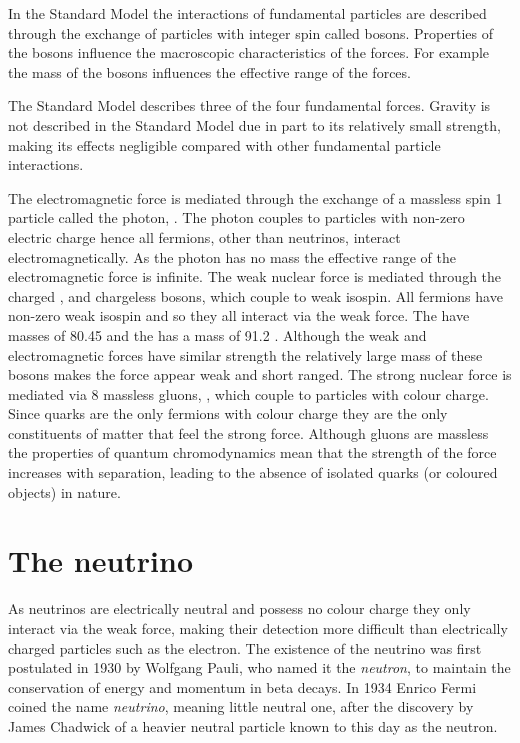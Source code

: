 In the Standard Model the interactions of fundamental particles are described through the exchange of particles with integer spin called bosons. Properties of the bosons influence the macroscopic characteristics of the forces. For example the mass of the bosons influences the effective range of the forces.

The Standard Model describes three of the four fundamental forces. Gravity is not described in the Standard Model due in part to its relatively small strength, making its effects negligible compared with other fundamental particle interactions.

The electromagnetic force is mediated through the exchange of a massless spin 1 particle called the photon, \Pphoton. The photon couples to particles with non-zero electric charge hence all fermions, other than neutrinos, interact electromagnetically. As the photon has no mass the effective range of the electromagnetic force is infinite. The weak nuclear force is mediated through the charged \PWplus, \PWminus and chargeless \PZzero bosons, which couple to weak isospin. All fermions have non-zero weak isospin and so they all interact via the weak force. The \PWpm have masses of 80.45 \GeV and the \PZzero has a mass of 91.2 \GeV. Although the weak and electromagnetic forces have similar strength the relatively large mass of these bosons makes the force appear weak and short ranged. The strong nuclear force is mediated via 8 massless gluons, \Pgluon, which couple to particles with colour charge. Since quarks are the only fermions with colour charge they are the only constituents of matter that feel the strong force. Although gluons are massless the properties of quantum chromodynamics mean that the strength of the force increases with separation, leading to the absence of isolated quarks (or coloured objects) in nature.



\section{The neutrino}
\label{section:particle-physics:neutrino}

As neutrinos are electrically neutral and possess no colour charge they only interact via the weak force, making their detection more difficult than electrically charged particles such as the electron. The existence of the neutrino was first postulated in 1930 by Wolfgang Pauli, who named it the \textit{neutron}, to maintain the conservation of energy and momentum in beta decays. In 1934 Enrico Fermi coined the name \textit{neutrino}, meaning little neutral one, after the discovery by James Chadwick of a heavier neutral particle known to this day as the neutron.

